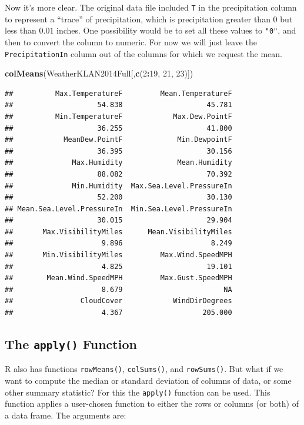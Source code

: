 \documentclass[
]{krantz}
\newenvironment{Shaded}{\begin{snugshade}}{\end{snugshade}}
\newcommand{\DecValTok}[1]{\textcolor[rgb]{0.00,0.00,0.81}{#1}}
\newcommand{\KeywordTok}[1]{\textcolor[rgb]{0.13,0.29,0.53}{\textbf{#1}}}
\newcommand{\NormalTok}[1]{#1}
\newcommand{\OperatorTok}[1]{\textcolor[rgb]{0.81,0.36,0.00}{\textbf{#1}}}
\begin{document}
Now it's more clear. The original data file included \texttt{T} in the precipitation column to represent a ``trace'' of precipitation, which is precipitation greater than \(0\) but less than \(0.01\) inches. One possibility would be to set all these values to \texttt{"0"}, and then to convert the column to numeric. For now we will just leave the \texttt{PrecipitationIn} column out of the columns for which we request the mean.

\begin{Shaded}
\begin{Highlighting}[]
\KeywordTok{colMeans}\NormalTok{(WeatherKLAN2014Full[,}\KeywordTok{c}\NormalTok{(}\DecValTok{2}\OperatorTok{:}\DecValTok{19}\NormalTok{, }\DecValTok{21}\NormalTok{, }\DecValTok{23}\NormalTok{)])}
\end{Highlighting}
\end{Shaded}

\begin{verbatim}
##          Max.TemperatureF         Mean.TemperatureF 
##                    54.838                    45.781 
##          Min.TemperatureF            Max.Dew.PointF 
##                    36.255                    41.800 
##            MeanDew.PointF             Min.DewpointF 
##                    36.395                    30.156 
##              Max.Humidity             Mean.Humidity 
##                    88.082                    70.392 
##              Min.Humidity  Max.Sea.Level.PressureIn 
##                    52.200                    30.130 
## Mean.Sea.Level.PressureIn  Min.Sea.Level.PressureIn 
##                    30.015                    29.904 
##       Max.VisibilityMiles      Mean.VisibilityMiles 
##                     9.896                     8.249 
##       Min.VisibilityMiles         Max.Wind.SpeedMPH 
##                     4.825                    19.101 
##        Mean.Wind.SpeedMPH         Max.Gust.SpeedMPH 
##                     8.679                        NA 
##                CloudCover            WindDirDegrees 
##                     4.367                   205.000
\end{verbatim}

\hypertarget{apply}{%
\subsection{\texorpdfstring{The \texttt{apply()} Function}{The apply() Function}}\label{apply}}

R also has functions \texttt{rowMeans()}, \texttt{colSums()}, and \texttt{rowSums()}. But what if we want to compute the median or standard deviation of columns of data, or some other summary statistic? For this the \texttt{apply()} function can be used. This function applies a user-chosen function to either the rows or columns (or both) of a data frame. The arguments are:
\end{document}
